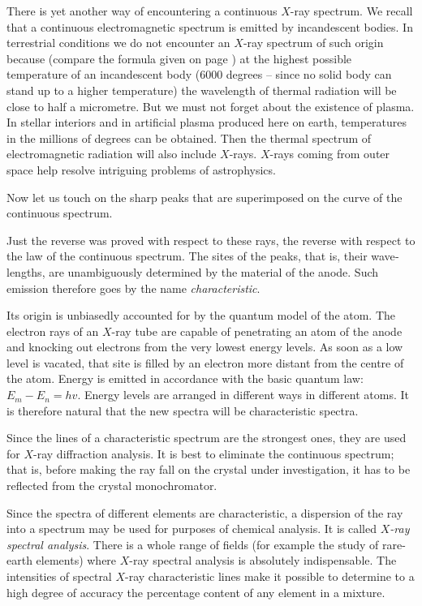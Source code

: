 There is yet another way of encountering a continuous $X$-ray spectrum. We recall that a continuous electro­magnetic spectrum is emitted by incandescent bodies. In terrestrial conditions we do not encounter an $X$-ray spectrum of such origin because (compare the formula given on page \pageref{lambdamax}) at the highest possible temperature of an incandescent body (6000 degrees -- since no solid body can stand up to a higher temperature) the wavelength of thermal radiation will be close to half a micrometre. But we must not forget about the existence of plasma. In stellar interiors and in artificial plasma produced here on earth, temperatures in the millions of degrees can be obtained. Then the thermal spectrum of electromagnetic radiation will also include $X$-rays. $X$-rays coming from outer space help resolve intriguing problems of astrophysics.

Now let us touch on the sharp peaks that are superim­posed on the curve of the continuous spectrum.

Just the reverse was proved with respect to these rays, the reverse with respect to the law of the continuous spectrum. The sites of the peaks, that is, their wave­ lengths, are unambiguously determined by the material of the anode. Such emission therefore goes by the name \emph{characteristic}.

Its origin is unbiasedly accounted for by the quantum model of the atom. The electron rays of an $X$-ray tube are capable of penetrating an atom of the anode and knocking out electrons from the very lowest energy levels. As soon as a low level is vacated, that site is filled by an electron more distant from the centre of the atom. Energy is emitted in accordance with the basic quantum law: $E_{m} - E_{n}=hv$. Energy levels are arranged in different ways in different atoms. It is therefore natural that the new spectra will be characteristic spectra.

Since the lines of a characteristic spectrum are the strongest ones, they are used for $X$-ray diffraction analy­sis. It is best to eliminate the continuous spectrum; that is, before making the ray fall on the crystal under inves­tigation, it has to be reflected from the crystal monochro­mator.

Since the spectra of different elements are characteris­tic, a dispersion of the ray into a spectrum may be used for purposes of chemical analysis. It is called \emph{$X$-ray spec­tral analysis}. There is a whole range of fields (for example the study of rare-earth elements) where $X$-ray spectral analysis is absolutely indispensable. The intensities of spectral $X$-ray characteristic lines make it possible to determine to a high degree of accuracy the percentage content of any element in a mixture.

